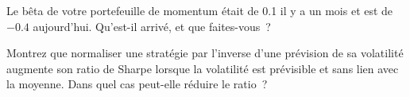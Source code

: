 \begin{interviewq}\label{iq:s1:momentum:5}
Le bêta de votre portefeuille de momentum était de 0.1 il y a un mois et est de $-0.4$ aujourd'hui. Qu'est-il arrivé, et que faites-vous~?
\end{interviewq}

\begin{interviewq}\label{iq:s1:momentum:6}
Montrez que normaliser une stratégie par l'inverse d'une prévision de sa volatilité augmente son ratio de Sharpe lorsque la volatilité est prévisible et sans lien avec la moyenne.
Dans quel cas peut-elle réduire le ratio~?
\end{interviewq}
